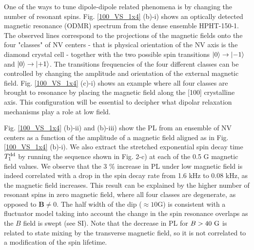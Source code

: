 \documentclass[preprintnumbers,amsmath,amssymb,superscriptaddress,twocolumn,showpacs]{revtex4-2}
\begin{document}

One of the ways to tune dipole-dipole related phenomena is by changing the number of resonant spins. Fig. \ref{100_VS_1x4} (b)-i) shows an optically detected magnetic resonance (ODMR) spectrum from the dense ensemble HPHT-150-1. The observed lines correspond to the projections of the magnetic fields onto the four "classes" of NV centers - that is physical orientation of the NV axis is the diamond crystal cell - together with the two possible spin transitions $\ket{0}\to\ket{-1}$ and $\ket{0}\to\ket{+1}$. The transitions frequencies of the four different classes can be controlled by changing the amplitude and orientation of the external magnetic field. Fig. \ref{100_VS_1x4} (c)-i) shows an example where all four classes are brought to resonance by placing the magnetic field along the [100] crystalline axis. 
This configuration will be essential to decipher what dipolar relaxation mechanisms play a role at low field. 

Fig. \ref{100_VS_1x4} (b)-ii) and (b)-iii) show the PL from an ensemble of NV centers as a function of the amplitude of a magnetic field aligned as in Fig. \ref{100_VS_1x4} (b)-i). 
We also extract the stretched exponential spin decay time $T_1^{\rm dd}$ by running the sequence shown in Fig. 2-c) at each of the 0.5 G magnetic field values. 
We observe that the 3 \% increase in PL under low magnetic field is indeed correlated with a drop in the spin decay rate from 1.6 kHz to 0.08 kHz, as the magnetic field increases. This result can be explained by the higher number of resonant spins in zero magnetic field, where all four classes are degenerate, as opposed to $\bm B \neq 0$. The half width of the dip ($\approx 10$G) is consistent with a fluctuator model taking into account the change in the spin resonance overlaps as the $B$ field is swept (see SI).
Note that the decrease in PL for $B>40\ \rm G$ is related to state mixing by the transverse magnetic field, so it is not correlated to a modification of the spin lifetime. 
\end{document}
